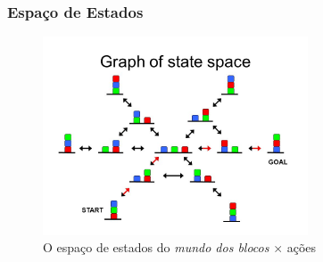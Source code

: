 \begin{frame}[fragile]
\frametitle{Espaço de Estados}

\begin{figure}[!htb]
\centering
\includegraphics[width=0.7\textwidth, height=0.70\textheight]{figures/mundo_dos_blocos02.jpg}
\caption{O espaço de estados do \textit{mundo dos blocos} $\times$ ações}
\end{figure}


\end{frame}



